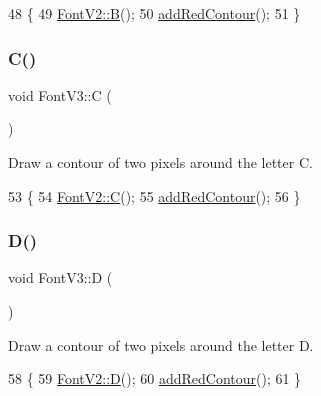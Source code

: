 \begin{DoxyCode}
48                \{
49     \mbox{\hyperlink{class_font_v2_a0a895c96067874028864303ab64ce889}{FontV2::B}}();
50     \mbox{\hyperlink{class_font_v3_a639f1eac0eb6724463813270f47e2696}{addRedContour}}();
51 \}
\end{DoxyCode}
\mbox{\label{class_font_v3_ada061c6a902b960bcfc04dbe37a1bee5}} 
\subsubsection{\texorpdfstring{C()}{C()}}
{\footnotesize\ttfamily void Font\+V3\+::C (\begin{DoxyParamCaption}{ }\end{DoxyParamCaption})}



Draw a contour of two pixels around the letter C. 


\begin{DoxyCode}
53                \{
54     \mbox{\hyperlink{class_font_v2_ab7dc3a07d1442bd391513c4c202f2a43}{FontV2::C}}();
55     \mbox{\hyperlink{class_font_v3_a639f1eac0eb6724463813270f47e2696}{addRedContour}}();
56 \}
\end{DoxyCode}
\mbox{\label{class_font_v3_aee01b6c22df5dfaaa48141fe78844087}} 
\subsubsection{\texorpdfstring{D()}{D()}}
{\footnotesize\ttfamily void Font\+V3\+::D (\begin{DoxyParamCaption}{ }\end{DoxyParamCaption})}



Draw a contour of two pixels around the letter D. 


\begin{DoxyCode}
58                \{
59     \mbox{\hyperlink{class_font_v2_ab6a088abff91bacc1096b6008296142b}{FontV2::D}}();
60     \mbox{\hyperlink{class_font_v3_a639f1eac0eb6724463813270f47e2696}{addRedContour}}();
61 \}
\end{DoxyCode}
\mbox{\label{class_font_v3_adf947a3aded58ead448368adc0628b16}} 
